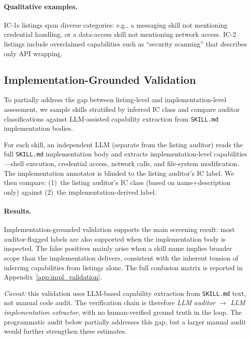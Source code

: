 \documentclass[11pt]{article}
\begin{document}
\paragraph{Qualitative examples.}
IC-1s listings span diverse categories: e.g., a
messaging skill not mentioning credential handling,
or a data-access skill not mentioning network access.
IC-2 listings include overclaimed capabilities such as
``security scanning'' that describes only API wrapping.

\subsection{Implementation-Grounded Validation}
\label{subsec:validation_impl}

To partially address the gap between listing-level and
implementation-level assessment, we sample skills
stratified by inferred IC class and compare auditor
classifications against
LLM-assisted capability extraction from \texttt{SKILL.md}
implementation bodies.

For each skill, an independent LLM (separate from the
listing auditor) reads the full \texttt{SKILL.md}
implementation body and extracts implementation-level
capabilities---shell execution, credential access, network
calls, and file-system modification.
The implementation annotator is blinded to the listing
auditor's IC label.
We then compare: (1)~the listing auditor's IC class
(based on name+description only) against (2)~the
implementation-derived label.

\paragraph{Results.}
Implementation-grounded validation supports the main
screening result: most auditor-flagged labels are
also supported when the implementation body is inspected.
The false positives mainly arise when a skill name implies
broader scope than the implementation delivers, consistent
with the inherent tension of inferring capabilities from
listings alone.
The full confusion matrix is reported in
Appendix~\ref{app:impl_validation}.

\emph{Caveat:} this validation uses LLM-based capability
extraction from \texttt{SKILL.md} text, not manual code
audit. The verification chain is therefore
\emph{LLM auditor $\to$ LLM implementation extractor},
with no human-verified ground truth in the loop.
The programmatic audit below partially addresses this gap,
but a larger manual audit would further strengthen
these estimates.
\end{document}
